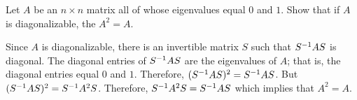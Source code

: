 \documentclass{ximera}
\begin{document}
\begin{exercise} \label{c10.3.6D}
Let $A$ be an $n\times n$ matrix all of whose eigenvalues equal $0$ and $1$. 
Show that if $A$ is diagonalizable, the $A^2=A$.

\begin{solution}
Since $A$ is diagonalizable, there is an invertible matrix $S$ such 
that $S^{-1} AS$ is diagonal.  The diagonal entries of  $S^{-1} AS$ are the eigenvalues
of $A$; that is, the diagonal entries equal $0$ and $1$.  Therefore, 
$(S^{-1} AS)^2=S^{-1} AS$.  But $(S^{-1} AS)^2 = S^{-1} A^2 S$.   Therefore, 
$S^{-1} A^2 S= S^{-1} AS$ which implies that $A^2=A$.

\end{solution}
\end{exercise}
\end{document}
